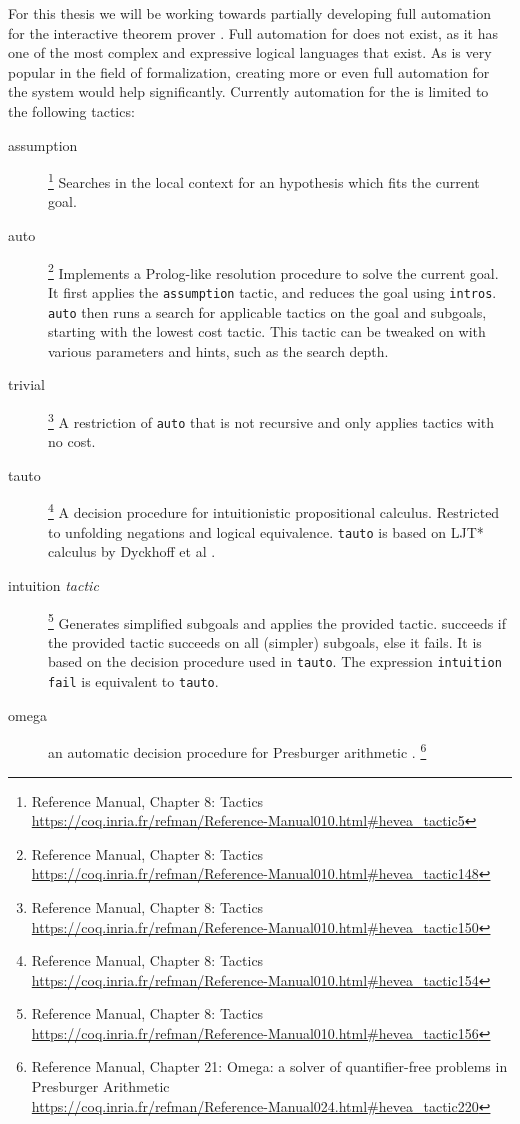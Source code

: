 For this thesis we will be working towards partially developing full automation for the interactive theorem prover \coq.
Full automation for \coq does not exist, as it has one of the most complex and expressive logical languages that exist.
As \coq is very popular in the field of formalization, creating more or even full automation for the system would help significantly.
Currently automation for the \coq is limited to the following tactics:
\begin{description}
\item[assumption]
  \footnote{
    \coq Reference Manual, Chapter 8:
    Tactics\\
    \url{https://coq.inria.fr/refman/Reference-Manual010.html\#hevea_tactic5}
  }
  Searches in the local context for an hypothesis which fits the current goal.
\item[auto]
  \footnote{
    \coq Reference Manual, Chapter 8:
    Tactics\\
    \url{https://coq.inria.fr/refman/Reference-Manual010.html\#hevea_tactic148}
  }
  Implements a Prolog-like resolution procedure to solve the current goal.
  It first applies the \texttt{assumption} tactic, and reduces the goal using \texttt{intros}.
  \texttt{auto} then runs a search for applicable tactics on the goal and subgoals, starting with the lowest cost tactic.
  This tactic can be tweaked on with various parameters and hints, such as the search depth.
\item[trivial]
  \footnote{
    \coq Reference Manual, Chapter 8:
    Tactics\\
    \url{https://coq.inria.fr/refman/Reference-Manual010.html\#hevea_tactic150}
  }
  A restriction of \texttt{auto} that is not recursive and only applies tactics with no cost.
\item[tauto]
  \footnote{
    \coq Reference Manual, Chapter 8:
    Tactics\\
    \url{https://coq.inria.fr/refman/Reference-Manual010.html\#hevea_tactic154}
  }
  A decision procedure for intuitionistic propositional calculus.
  Restricted to unfolding negations and logical equivalence.
  \texttt{tauto} is based on LJT* calculus by Dyckhoff et al \cite{dyckhoff1992contraction}.
\item[intuition \emph{tactic}]
  \footnote{
    \coq Reference Manual, Chapter 8:
    Tactics\\
    \url{https://coq.inria.fr/refman/Reference-Manual010.html\#hevea_tactic156}
  }
  Generates simplified subgoals and applies the provided tactic.
   succeeds if the provided tactic succeeds on all (simpler) subgoals, else it fails.
  It is based on the decision procedure used in \texttt{tauto}.
  The expression \texttt{intuition fail} is equivalent to \texttt{tauto}.
\item[omega]
  an automatic decision procedure for Presburger arithmetic \cite{stansifer1984presburger}.%
  \footnote{
    \coq Reference Manual, Chapter 21:
    Omega: a solver of quantifier-free problems in Presburger Arithmetic\\
    \url{https://coq.inria.fr/refman/Reference-Manual024.html\#hevea_tactic220}
  }
\end{description}

